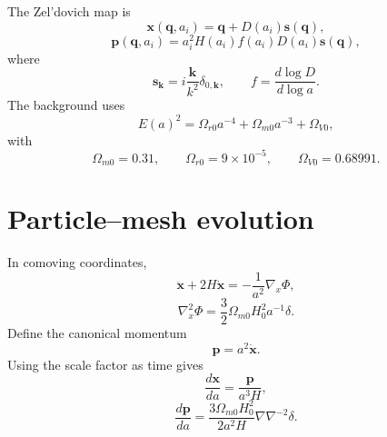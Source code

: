 The Zel'dovich map is
\begin{equation}
 \boldsymbol x(\boldsymbol q,a_i)
 =
 \boldsymbol q+D(a_i)\boldsymbol s(\boldsymbol q),
 \label{eq:pm-zeldovich-position}
\end{equation}
\begin{equation}
 \boldsymbol p(\boldsymbol q,a_i)
 =
 a_i^2H(a_i)f(a_i)D(a_i)\boldsymbol s(\boldsymbol q),
 \label{eq:pm-zeldovich-momentum}
\end{equation}
where
\begin{equation}
 \boldsymbol s_{\boldsymbol k}
 =
 i\frac{\boldsymbol k}{k^2}\delta_{0,\boldsymbol k},
 \qquad
 f=\frac{d\log D}{d\log a}.
 \label{eq:pm-zeldovich-displacement}
\end{equation}
The background uses
\begin{equation}
 E(a)^2
 =
 \Omega_{r0}a^{-4}
 +\Omega_{m0}a^{-3}
 +\Omega_{V0},
 \label{eq:pm-background}
\end{equation}
with
\begin{equation}
 \Omega_{m0}=0.31,
 \qquad
 \Omega_{r0}=9\times10^{-5},
 \qquad
 \Omega_{V0}=0.68991.
 \label{eq:pm-background-values}
\end{equation}

\section{Particle--mesh evolution}

In comoving coordinates,
\begin{equation}
 \ddot{\boldsymbol x}+2H\dot{\boldsymbol x}
 =
 -\frac{1}{a^2}\nabla_x\Phi,
 \label{eq:pm-comoving-equation}
\end{equation}
\begin{equation}
 \nabla_x^2\Phi
 =
 \frac32\Omega_{m0}H_0^2a^{-1}\delta.
 \label{eq:pm-poisson}
\end{equation}
Define the canonical momentum
\begin{equation}
 \boldsymbol p=a^2\dot{\boldsymbol x}.
 \label{eq:pm-canonical-momentum}
\end{equation}
Using the scale factor as time gives
\begin{equation}
 \frac{d\boldsymbol x}{da}
 =
 \frac{\boldsymbol p}{a^3H},
 \label{eq:pm-drift-equation}
\end{equation}
\begin{equation}
 \frac{d\boldsymbol p}{da}
 =
 \frac{3\Omega_{m0}H_0^2}{2a^2H}
 \nabla\nabla^{-2}\delta.
 \label{eq:pm-kick-equation}
\end{equation}

